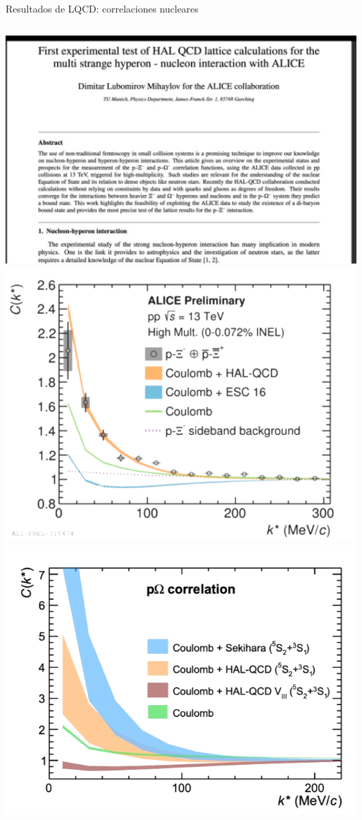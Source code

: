 \documentclass{beamer}
\begin{document}
  

\begin{frame}{Resultados de LQCD: correlaciones nucleares}
  \begin{columns}
    \includegraphics[width=\linewidth]{figures/alice_hal_qcd_paper.png}
    \includegraphics[width=\linewidth]{figures/alice_corr1.png}
    \includegraphics[width=\linewidth]{figures/alice_corr2.png}

\end{columns}
\end{frame}
\end{document}
